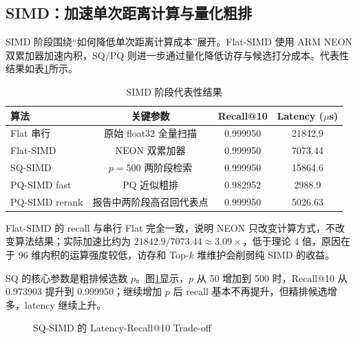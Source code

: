 \documentclass[a4paper]{article}
\begin{document}
\subsection{SIMD：加速单次距离计算与量化粗排}

SIMD 阶段围绕“如何降低单次距离计算成本”展开。Flat-SIMD 使用 ARM NEON 双累加器加速内积，SQ/PQ 则进一步通过量化降低访存与候选打分成本。代表性结果如表\ref{tab:simd-main}所示。

\begin{table}[H]
\centering
\caption{SIMD 阶段代表性结果}
\label{tab:simd-main}
\begin{tabular}{lccc}
\toprule
算法 & 关键参数 & Recall@10 & Latency ($\mu$s) \\
\midrule
Flat 串行 & 原始 float32 全量扫描 & 0.999950 & 21842.9 \\
Flat-SIMD & NEON 双累加器 & 0.999950 & 7073.44 \\
SQ-SIMD & $p=500$ 两阶段检索 & 0.999950 & 15864.6 \\
PQ-SIMD fast & PQ 近似粗排 & 0.982952 & 2988.9 \\
PQ-SIMD rerank & 报告中两阶段高召回代表点 & 0.999950 & 5026.63 \\
\bottomrule
\end{tabular}
\end{table}

Flat-SIMD 的 recall 与串行 Flat 完全一致，说明 NEON 只改变计算方式，不改变算法结果；实际加速比约为 $21842.9/7073.44\approx 3.09\times$，低于理论 4 倍，原因在于 96 维内积的运算强度较低，访存和 Top-$k$ 堆维护会削弱纯 SIMD 的收益。

SQ 的核心参数是粗排候选数 $p$。图\ref{fig:sq-tradeoff}显示，$p$ 从 50 增加到 500 时，Recall@10 从 0.973903 提升到 0.999950；继续增加 $p$ 后 recall 基本不再提升，但精排候选增多，latency 继续上升。

\begin{figure}[H]
\centering
{}
\caption{SQ-SIMD 的 Latency-Recall@10 Trade-off}
\label{fig:sq-tradeoff}
\end{figure}
\end{document}

